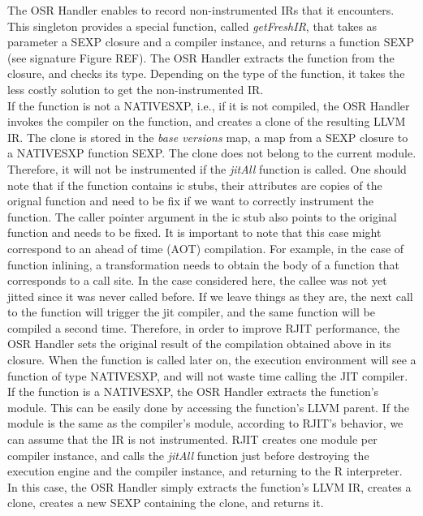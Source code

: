 The OSR Handler enables to record non-instrumented IRs that it encounters.
This singleton provides a special function, called \textit{getFreshIR}, that takes as parameter a SEXP closure and a compiler instance, and returns a function SEXP (see signature Figure REF).
The OSR Handler extracts the function from the closure, and checks its type.
Depending on the type of the function, it takes the less costly solution to get the non-instrumented IR.\\

If the function is not a NATIVESXP, i.e., if it is not compiled, the OSR Handler invokes the compiler on the function, and creates a clone of the resulting LLVM IR.
The clone is stored in the \textit{base versions} map, a map from a SEXP closure to a NATIVESXP function SEXP.
The clone does not belong to the current module.
Therefore, it will not be instrumented if the \textit{jitAll} function is called.
One should note that if the function contains ic stubs, their attributes are copies of the orignal function and need to be fix if we want to correctly instrument the function.
The caller pointer argument in the ic stub also points to the original function and needs to be fixed.
It is important to note that this case might correspond to an ahead of time (AOT) compilation.
For example, in the case of function inlining, a transformation needs to obtain the body of a function that corresponds to a call site.
In the case considered here, the callee was not yet jitted since it was never called before.
If we leave things as they are, the next call to the function will trigger the jit compiler, and the same function will be compiled a second time.
Therefore, in order to improve RJIT performance, the OSR Handler sets the original result of the compilation obtained above in its closure.
When the function is called later on, the execution environment will see a function of type NATIVESXP, and will not waste time calling the JIT compiler.\\

If the function is a NATIVESXP, the OSR Handler extracts the function's module.
This can be easily done by accessing the function's LLVM parent.
If the module is the same as the compiler's module, according to RJIT's behavior, we can assume that the IR is not instrumented.
RJIT creates one module per compiler instance, and calls the \textit{jitAll} function just before destroying the execution engine and the compiler instance, and returning to the R interpreter.
In this case, the OSR Handler simply extracts the function's LLVM IR, creates a clone, creates a new SEXP containing the clone, and returns it.\\


